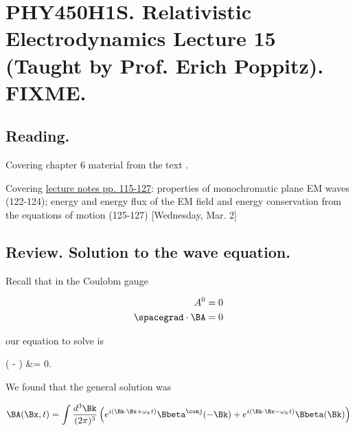
%

\chapter{PHY450H1S.  Relativistic Electrodynamics Lecture 15 (Taught by Prof. Erich Poppitz).  FIXME.}
\label{chap:relativisticElectrodynamicsL16}
{}
\date{Mar 2, 2011}

\beginArtNoToc

\section{Reading.}

Covering chapter 6 material from the text \cite{landau1980classical}.

Covering \href{http://www.physics.utoronto.ca/~poppitz/e-poppitz/PHY450_files/RelEMpp115-127.pdf}{lecture notes pp. 115-127}: properties of monochromatic plane EM waves (122-124); energy and energy flux of the EM field and energy conservation from the equations of motion (125-127)  [Wednesday, Mar. 2]

\section{Review.  Solution to the wave equation.}

Recall that in the Coulobm gauge

\begin{align}\label{eqn:relativisticElectrodynamicsL15:10}
A^0 &= 0 \\
\spacegrad \cdot \BA &= 0 \\
\end{align}

our equation to solve is

\left(   - \Delta \right) \BA &= 0.

We found that the general solution was

\begin{equation}\label{eqn:relativisticElectrodynamicsL15:730}
\BA(\Bx, t) = \int \frac{d^3\Bk}{(2 \pi)^3} \left( 
e^{i (\Bk \cdot \Bx + \omega_k t)} \Bbeta^\conj(-\Bk)
+e^{i (\Bk \cdot \Bx - \omega_k t)} \Bbeta(\Bk)
\right)
\end{equation}

